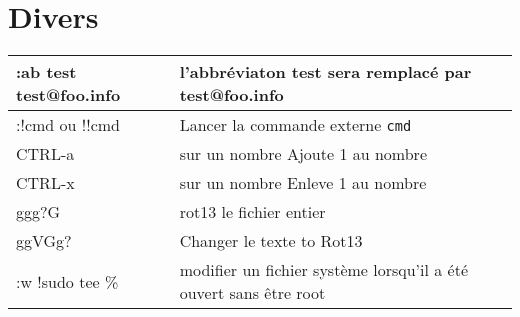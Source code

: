 \documentclass{article}
\begin{document}
\section{Divers}
\begin{tabular}{|p{4cm}| l| }
\hline
:ab test test@foo.info & l'abbréviaton test sera remplacé par test@foo.info \\ \hline
:!cmd ou !!cmd & Lancer la commande externe \verb?cmd?  \\ \hline
    CTRL-a &sur un nombre Ajoute 1 au nombre \\ \hline
    CTRL-x &sur un nombre Enleve 1 au nombre \\ \hline
    ggg?G   & rot13 le fichier entier \\ \hline
    ggVGg? 	& Changer le texte to Rot13 \\ \hline
    :w !sudo tee \% &  modifier un fichier système lorsqu'il a été ouvert sans être root \\ \hline
\end{tabular}\\
\end{document}
